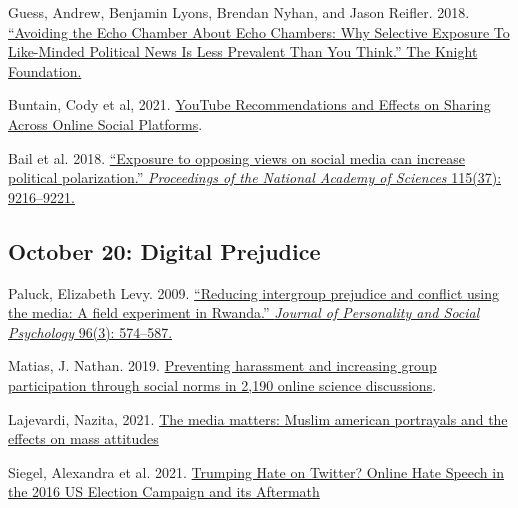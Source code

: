 \vspace{-.1in}\documentclass[11pt]{article}
\begin{document}
\noindent Guess, Andrew, Benjamin Lyons, Brendan Nyhan, and Jason Reifler. 2018. \href{https://kf-site-production.s3.amazonaws.com/media_elements/files/000/000/133/original/Topos_KF_White-Paper_Nyhan_V1.pdf}{``Avoiding the Echo Chamber About Echo Chambers: Why Selective Exposure To Like-Minded Political News Is Less Prevalent Than You Think.'' The Knight Foundation.}


\noindent Buntain, Cody et al, 2021. \href{https://dl.acm.org/doi/10.1145/3449085}{YouTube Recommendations and Effects on Sharing Across Online Social Platforms}.
	
\noindent Bail et al. 2018. \href{https://www.pnas.org/content/115/37/9216}{``Exposure to opposing views on social media can increase political polarization.'' \emph{Proceedings of the National Academy of Sciences} 115(37): 9216--9221.}	
	




\subsection*{October 20: Digital Prejudice }

Paluck, Elizabeth Levy. 2009. \href{https://psycnet.apa.org/fulltext/2009-02415-005.pdf}{``Reducing intergroup prejudice and conflict using the media: A field experiment in Rwanda.'' \emph{Journal of Personality and Social Psychology} 96(3): 574--587.}

\noindent Matias, J. Nathan. 2019. \href{https://www.pnas.org/content/pnas/116/20/9785.full.pdf}{Preventing harassment and increasing group participation through social norms in 2,190 online	science discussions}.

\noindent Lajevardi, Nazita, 2021. \href{https://www.journals.uchicago.edu/doi/full/10.1086/711300?casa_token=wITxV2WJeaQAAAAA:1wco3QZFwUnMq6EOzYON4LXw2XZUU-By0eeehfQq8QuDzgcUuQW93THNT8o7USkGF81ypdGHcHA}{The media matters: Muslim american portrayals and the effects on mass attitudes}

\noindent Siegel, Alexandra et al. 2021. \href{https://alexandra-siegel.com/wp-content/uploads/2019/08/qjps_election_hatespeech_RR.pdf}{Trumping Hate on Twitter? Online Hate Speech in the 2016 US Election Campaign and its Aftermath}
\end{document}
